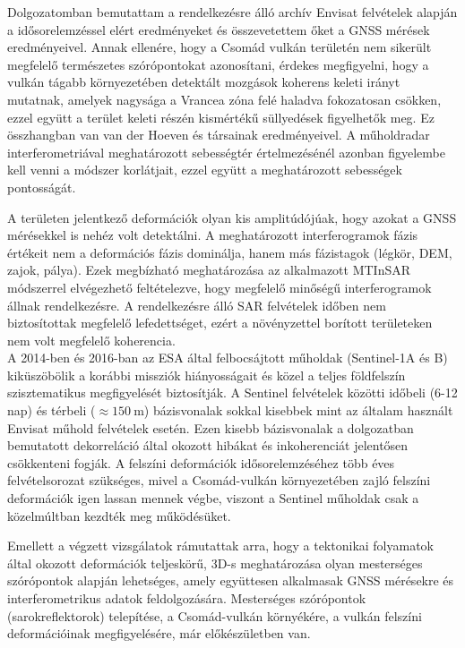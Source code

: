 \documentclass[12pt]{report}
\numberwithin{equation}{section}
\numberwithin{table}{section}
\numberwithin{figure}{section}
\begin{document}
Dolgozatomban bemutattam a rendelkezésre álló archív Envisat felvételek alapján a \stamps idősorelemzéssel elért eredményeket és összevetettem őket a GNSS  mérések eredményeivel. Annak ellenére, hogy a Csomád vulkán területén nem sikerült megfelelő természetes szórópontokat azonosítani, érdekes megfigyelni, hogy a vulkán tágabb környezetében detektált mozgások koherens keleti irányt mutatnak, amelyek nagysága a Vrancea zóna felé haladva fokozatosan csökken, ezzel együtt a terület keleti részén kismértékű süllyedések figyelhetők meg.
Ez összhangban van van der Hoeven és társainak \cite{Hoeven2005} eredményeivel. A műholdradar interferometriával meghatározott sebességtér értelmezésénél azonban figyelembe kell venni a módszer korlátjait, ezzel együtt a meghatározott sebességek pontosságát.

A területen jelentkező deformációk olyan kis amplitúdójúak, hogy azokat a GNSS mérésekkel is nehéz volt detektálni. A meghatározott interferogramok fázis értékeit nem a deformációs fázis dominálja, hanem más fázistagok (légkör, DEM, zajok, pálya). Ezek megbízható meghatározása az alkalmazott MTInSAR módszerrel elvégezhető feltételezve, hogy megfelelő minőségű interferogramok állnak rendelkezésre. A rendelkezésre álló SAR felvételek időben nem biztosítottak megfelelő lefedettséget, ezért a növényzettel borított területeken nem volt megfelelő koherencia.\\[25pt]
A 2014-ben és 2016-ban az ESA által felbocsájtott műholdak (Sentinel-1A és B) kiküszöbölik a korábbi missziók hiányosságait és közel a teljes földfelszín szisztematikus megfigyelését biztosítják. A Sentinel felvételek közötti időbeli (6-12 nap) és térbeli ($\approx \SI{150}{\meter}$) bázisvonalak sokkal kisebbek mint az általam használt Envisat műhold felvételek esetén. Ezen kisebb bázisvonalak a dolgozatban bemutatott dekorreláció által okozott hibákat és inkoherenciát jelentősen csökkenteni fogják. A felszíni deformációk idősorelemzéséhez több éves felvételsorozat szükséges, mivel a Csomád-vulkán környezetében zajló felszíni deformációk igen lassan mennek végbe, viszont a Sentinel műholdak csak a közelmúltban kezdték meg működésüket.

Emellett a végzett vizsgálatok rámutattak arra, hogy a tektonikai folyamatok által okozott deformációk teljeskörű, 3D-s meghatározása olyan mesterséges szórópontok alapján lehetséges, amely együttesen alkalmasak GNSS mérésekre és interferometrikus adatok feldolgozására. Mesterséges szórópontok (sarokreflektorok) telepítése, a Csomád-vulkán környékére, a vulkán felszíni deformációinak megfigyelésére, már előkészületben van.
\end{document}

